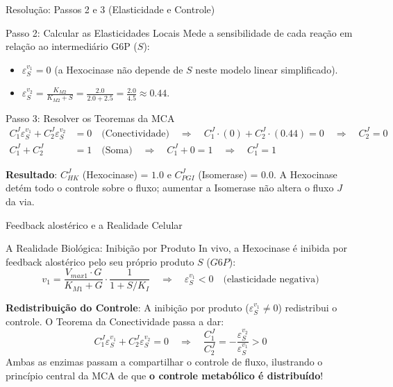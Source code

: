 \begin{frame}{Resolução: Passos 2 e 3 (Elasticidade e Controle)}
\begin{block}{Passo 2: Calcular as Elasticidades Locais}
Mede a sensibilidade de cada reação em relação ao intermediário G6P ($S$):
\begin{itemize}
    \item $\varepsilon_S^{v_1} = 0$ (a Hexocinase não depende de $S$ neste modelo linear simplificado).
    \item $\varepsilon_S^{v_2} = \frac{K_{M2}}{K_{M2} + S} = \frac{2.0}{2.0 + 2.5} = \frac{2.0}{4.5} \approx 0.44$.
\end{itemize}
\end{block}

\begin{block}{Passo 3: Resolver os Teoremas da MCA}
\begin{align*}
C_1^J \varepsilon_S^{v_1} + C_2^J \varepsilon_S^{v_2} &= 0 \quad \text{(Conectividade)} \quad \Rightarrow \quad C_1^J \cdot (0) + C_2^J \cdot (0.44) = 0 \quad \Rightarrow \quad C_2^J = 0 \\
C_1^J + C_2^J &= 1 \quad \text{(Soma)} \quad \Rightarrow \quad C_1^J + 0 = 1 \quad \Rightarrow \quad C_1^J = 1
\end{align*}
\end{block}

\vspace{0.1cm}
\centering
\textcolor{azulescuro}{\textbf{Resultado}: $C_{HK}^J$ (Hexocinase) = $1.0$ e $C_{PGI}^J$ (Isomerase) = $0.0$. A Hexocinase detém todo o controle sobre o fluxo; aumentar a Isomerase não altera o fluxo $J$ da via.}
\end{frame}

\begin{frame}{Feedback alostérico e a Realidade Celular}
\begin{block}{A Realidade Biológica: Inibição por Produto}
In vivo, a Hexocinase é inibida por feedback alostérico pelo seu próprio produto $S$ ($G6P$):
\begin{equation*}
v_1 = \frac{V_{max1} \cdot G}{K_{M1} + G} \cdot \frac{1}{1 + S / K_{I}} \quad \Rightarrow \quad \varepsilon_S^{v_1} < 0 \quad \text{(elasticidade negativa)}
\end{equation*}
\end{block}

\vspace{0.1cm}
\centering\small
\textcolor{azulescuro}{\textbf{Redistribuição do Controle}: A inibição por produto ($\varepsilon_S^{v_1} \neq 0$) redistribui o controle. O Teorema da Conectividade passa a dar:
\begin{equation*}
C_1^J \varepsilon_S^{v_1} + C_2^J \varepsilon_S^{v_2} = 0 \quad \Rightarrow \quad \frac{C_1^J}{C_2^J} = -\frac{\varepsilon_S^{v_2}}{\varepsilon_S^{v_1}} > 0
\end{equation*}
Ambas as enzimas passam a compartilhar o controle de fluxo, ilustrando o princípio central da MCA de que \textbf{o controle metabólico é distribuído}!}
\end{frame}

